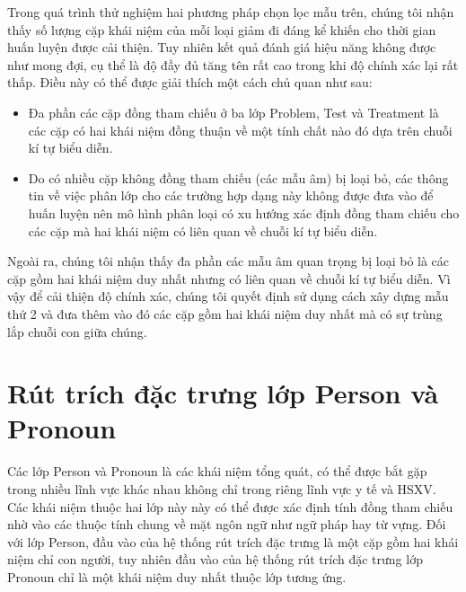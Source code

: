 Trong quá trình thử nghiệm hai phương pháp chọn lọc mẫu trên, chúng tôi nhận thấy số lượng cặp khái niệm của mỗi loại giảm đi đáng kể khiến cho thời gian huấn luyện được cải thiện. Tuy nhiên kết quả đánh giá hiệu năng không được như mong đợi, cụ thể là độ đầy đủ tăng tên rất cao trong khi độ chính xác lại rất thấp. Điều này có thể được giải thích một cách chủ quan như sau:
\begin{itemize}
\item Đa phần các cặp đồng tham chiếu ở ba lớp Problem, Test và Treatment là các cặp có hai khái niệm đồng thuận về một tính chất nào đó dựa trên chuỗi kí tự biểu diễn.
\item Do có nhiều cặp không đồng tham chiếu (các mẫu âm) bị loại bỏ, các thông tin về việc phân lớp cho các trường hợp dạng này không được đưa vào để huấn luyện nên mô hình phân loại có xu hướng xác định đồng tham chiếu cho các cặp mà hai khái niệm có liên quan về chuỗi kí tự biểu diễn.
\end{itemize}

Ngoài ra, chúng tôi nhận thấy đa phần các mẫu âm quan trọng bị loại bỏ là các cặp gồm hai khái niệm duy nhất nhưng có liên quan về chuỗi kí tự biểu diễn. Vì vậy để cải thiện độ chính xác, chúng tôi quyết định sử dụng cách xây dựng mẫu thứ 2 và đưa thêm vào đó các cặp gồm hai khái niệm duy nhất mà có sự trùng lắp chuỗi con giữa chúng.

\section{Rút trích đặc trưng lớp Person và Pronoun}
Các lớp Person và Pronoun là các khái niệm tổng quát, có thể được bắt gặp trong nhiều lĩnh vực khác nhau không chỉ trong riêng lĩnh vực y tế và HSXV. Các khái niệm thuộc hai lớp này này có thể được xác định tính đồng tham chiếu nhờ vào các thuộc tính chung về mặt ngôn ngữ như ngữ pháp hay từ vựng. Đối với lớp Person, đầu vào của hệ thống rút trích đặc trưng là một cặp gồm hai khái niệm chỉ con người, tuy nhiên đầu vào của hệ thống rút trích đặc trưng lớp Pronoun chỉ là một khái niệm duy nhất thuộc lớp tương ứng.


